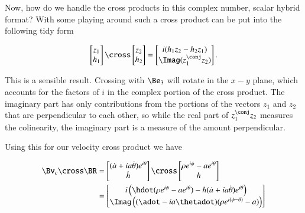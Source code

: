 {Now, how do we handle the cross products in this complex number, scalar hybrid format?  With some playing around such a cross product can be put into the following tidy form

\begin{equation}\label{eqn:relativisticElectrodynamicsExamReflection:960}
\begin{bmatrix}
z_1 \\
h_1
\end{bmatrix}
\cross
\begin{bmatrix}
z_2 \\
h_2
\end{bmatrix}
=
\begin{bmatrix}
i (h_1 z_2 - h_2 z_1) \\
\Imag(z_1^\conj z_2)
\end{bmatrix}.
\end{equation}

This is a sensible result.  Crossing with \(\Be_3\) will rotate in the \(x-y\) plane, which accounts for the factors of \(i\) in the complex portion of the cross product.  The imaginary part has only contributions from the portions of the vectors \(z_1\) and \(z_2\) that are perpendicular to each other, so while the real part of \(z_1^\conj z_2\) measures the colinearity, the imaginary part is a measure of the amount perpendicular.

Using this for our velocity cross product we have

\begin{equation}\label{eqn:relativisticElectrodynamicsExamReflection:1310}
\begin{aligned}
\Bv_c \cross \BR
&=
\begin{bmatrix}
(\dot{a} + i a \dot{\theta}) e^{i\theta} \\
\dot{h}
\end{bmatrix}
\cross
\begin{bmatrix}
\rho e^{i\phi} - a e^{i\theta} \\
h
\end{bmatrix} \\
&=
\begin{bmatrix}
i\left(\hdot ( \rho e^{i\phi} - a e^{i\theta} ) - h (\dot{a} + i a \dot{\theta}) e^{i\theta} \right) \\
\Imag \left( ( \adot - i a \thetadot) (\rho e^{i(\phi - \theta)} - a) \right)
\end{bmatrix}
\end{aligned}
\end{equation}

}
